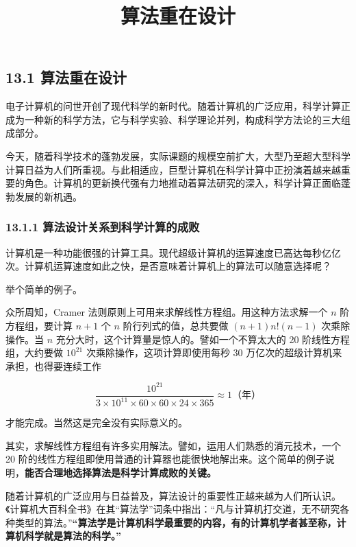 \documentclass[
  10pt,
  fontset=fandol]{ctexart}
\title{算法重在设计}
\author{}
\date{}
\begin{document}
\maketitle

\subsection{13.1 算法重在设计}\label{ux7b97ux6cd5ux91cdux5728ux8bbeux8ba1}

电子计算机的问世开创了现代科学的新时代。随着计算机的广泛应用，科学计算正成为一种新的科学方法，它与科学实验、科学理论并列，构成科学方法论的三大组成部分。

今天，随着科学技术的蓬勃发展，实际课题的规模空前扩大，大型乃至超大型科学计算日益为人们所重视。与此相适应，巨型计算机在科学计算中正扮演着越来越重要的角色。计算机的更新换代强有力地推动着算法研究的深入，科学计算正面临蓬勃发展的新机遇。

\subsubsection{13.1.1 算法设计关系到科学计算的成败}\label{ux7b97ux6cd5ux8bbeux8ba1ux5173ux7cfbux5230ux79d1ux5b66ux8ba1ux7b97ux7684ux6210ux8d25}

计算机是一种功能很强的计算工具。现代超级计算机的运算速度已高达每秒亿亿次。计算机运算速度如此之快，是否意味着计算机上的算法可以随意选择呢？

举个简单的例子。

众所周知，Cramer 法则原则上可用来求解线性方程组。用这种方法求解一个 \(n\) 阶方程组，要计算 \(n+1\) 个 \(n\) 阶行列式的值，总共要做 \((n+1)n!(n-1)\) 次乘除操作。当 \(n\) 充分大时，这个计算量是惊人的。譬如一个不算太大的 20 阶线性方程组，大约要做 \(10^{21}\) 次乘除操作，这项计算即使用每秒 30 万亿次的超级计算机来承担，也得要连续工作

\[
\frac{10^{21}}{3\times10^{11}\times60\times60\times24\times365}\approx1\text{（年）}
\]

才能完成。当然这是完全没有实际意义的。

其实，求解线性方程组有许多实用解法。譬如，运用人们熟悉的消元技术，一个 20 阶的线性方程组即使用普通的计算器也能很快地解出来。这个简单的例子说明，\textbf{能否合理地选择算法是科学计算成败的关键。}

随着计算机的广泛应用与日益普及，算法设计的重要性正越来越为人们所认识。《计算机大百科全书》在其``算法学''词条中指出：``凡与计算机打交道，无不研究各种类型的算法。''\textbf{``算法学是计算机科学最重要的内容，有的计算机学者甚至称，计算机科学就是算法的科学。''}
\end{document}

